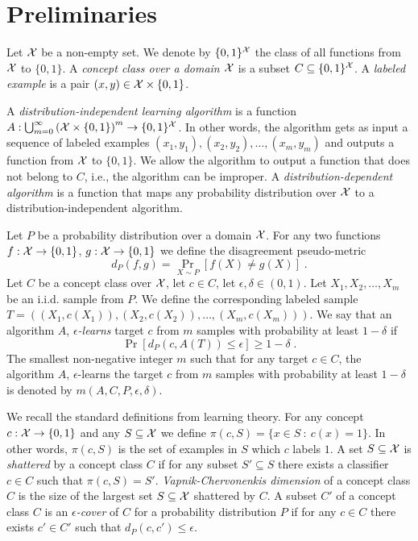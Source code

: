 \section{Preliminaries}
\label{section:preliminaries}

Let $\mathcal{X}$ be a non-empty set. We denote by $\{0,1\}^{\mathcal{X}}$ the class of all
functions from $\mathcal{X}$ to $\{0,1\}$. A \emph{concept class over a domain $\mathcal{X}$} is a
subset $C \subseteq \{0,1\}^{\mathcal{X}}$. A \emph{labeled example} is a pair $(x,y) \in
\mathcal{X} \times \{0,1\}$.

A \emph{distribution-independent learning algorithm} is a function
$A:\bigcup_{m=0}^\infty \left(\mathcal{X} \times \{0,1\} \right)^m \to \{0,1\}^{\mathcal{X}}$. In
other words, the algorithm gets as input a sequence of labeled examples $(x_1,
y_1), (x_2, y_2), \dots, (x_m, y_m)$ and outputs a function from $\mathcal{X}$ to
$\{0,1\}$. We allow the algorithm to output a function that does not belong to
$C$, i.e., the algorithm can be improper. A \emph{distribution-dependent
algorithm} is a function that maps any probability distribution over $\mathcal{X}$ to a
distribution-independent algorithm.

Let $P$ be a probability distribution over a domain $\mathcal{X}$. For any two functions
$f:\mathcal{X} \to \{0,1\}$, $g:\mathcal{X} \to \{0,1\}$ we define the disagreement pseudo-metric
$$
d_P(f,g) = \Pr_{X \sim P}[f(X) \neq g(X)] \; .
$$
Let $C$ be a concept class over $\mathcal{X}$, let $c \in C$, let $\epsilon, \delta \in (0,1)$.
Let  $X_1, X_2, \dots, X_m$ be an i.i.d. sample from $P$. We define the corresponding
labeled sample $T = ((X_1, c(X_1)), (X_2, c(X_2)), \dots, (X_m, c(X_m)))$.
We say that an algorithm $A$, \emph{$\epsilon$-learns} target $c$ from $m$ samples
with probability at least $1 - \delta$ if
$$
\Pr \left[d_P(c,A(T)) \le \epsilon \right]  \ge 1 - \delta \; .
$$
The smallest non-negative integer $m$ such that for any target $c \in C$,
the algorithm $A$, $\epsilon$-learns the target $c$ from $m$ samples
with probability at least $1-\delta$ is denoted by $m(A,C,P,\epsilon,\delta)$.

We recall the standard definitions from learning theory. For any concept $c:\mathcal{X}
\to \{0,1\}$ and any $S \subseteq \mathcal{X}$ we define $\pi(c,S) = \{x \in S ~:~ c(x) =
1 \}$. In other words, $\pi(c,S)$ is the set of examples in $S$ which $c$ labels
$1$. A set $S \subseteq \mathcal{X}$ is \emph{shattered} by a concept class $C$ if for
any subset $S' \subseteq S$ there exists a classifier $c \in C$ such that
$\pi(c,S) = S'$. \emph{Vapnik-Chervonenkis dimension} of a concept class $C$ is
the size of the largest set $S \subseteq \mathcal{X}$ shattered by $C$. A subset $C'$ of
a concept class $C$ is an \emph{$\epsilon$-cover} of $C$ for a probability
distribution $P$ if for any $c \in C$ there exists $c' \in C'$ such that
$d_P(c,c') \le \epsilon$.

